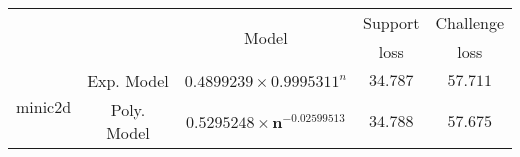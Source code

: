 \begin{tabular}{ccccc} 
\hline 
 &  & \multirow{2}{*}{Model} & Support & Challenge\tabularnewline 
 &  &  & loss  & loss\tabularnewline 
\hline 
\hline 
\multirow{2}{*}{minic2d} & Exp. Model & $0.4899239\times 0.9995311^{n}$ & $34.787$ & $57.711$ \tabularnewline 
 & Poly. Model & $\mathbf{0.5295248\times n^{-0.02599513}}$ & $\mathbf{34.788}$ & $\mathbf{57.675}$ \tabularnewline 
\hline 
\end{tabular} 


